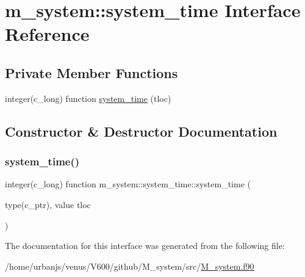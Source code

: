 \hypertarget{interfacem__system_1_1system__time}{}\section{m\+\_\+system\+:\+:system\+\_\+time Interface Reference}
\label{interfacem__system_1_1system__time}
\subsection*{Private Member Functions}
\begin{DoxyCompactItemize}
\item 
integer(c\+\_\+long) function \mbox{\hyperlink{interfacem__system_1_1system__time_a3fde911ef46a12e6669a9f62766d1978}{system\+\_\+time}} (tloc)
\end{DoxyCompactItemize}


\subsection{Constructor \& Destructor Documentation}
\mbox{\label{interfacem__system_1_1system__time_a3fde911ef46a12e6669a9f62766d1978}} 
\subsubsection{\texorpdfstring{system\+\_\+time()}{system\_time()}}
{\footnotesize\ttfamily integer(c\+\_\+long) function m\+\_\+system\+::system\+\_\+time\+::system\+\_\+time (\begin{DoxyParamCaption}\item[{type(c\+\_\+ptr), value}]{tloc }\end{DoxyParamCaption})\hspace{0.3cm}{\ttfamily [private]}}



The documentation for this interface was generated from the following file\+:\begin{DoxyCompactItemize}
\item 
/home/urbanjs/venus/\+V600/github/\+M\+\_\+system/src/\mbox{\hyperlink{M__system_8f90}{M\+\_\+system.\+f90}}\end{DoxyCompactItemize}
